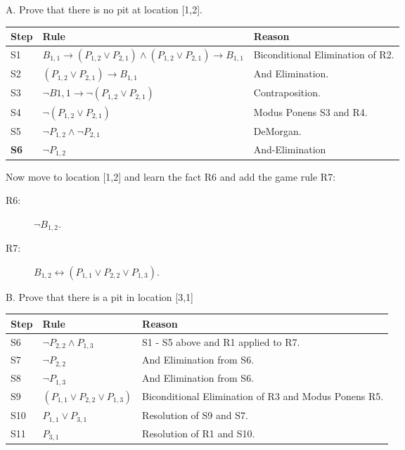 \documentclass[]{article}
\begin{document}
A.  Prove that there is no pit at location [1,2].
\vspace{4mm}

{\tabulinesep=1.5mm
\begin{tabu}{| l | l | l |}
\hline
Step & Rule & Reason \\
\hline
S1 & $B_{1,1} \rightarrow (P_{1,2} \vee P_{2,1}) \wedge (P_{1,2} \vee P_{2,1}) \rightarrow B_{1,1}$ & Biconditional Elimination of R2. \\
S2 & $(P_{1,2} \vee P_{2,1}) \rightarrow B_{1,1}$ & And Elimination. \\
S3 & $\neg B{1,1} \rightarrow \neg(P_{1,2} \vee P_{2,1})$ & Contraposition. \\
S4 & $\neg(P_{1,2} \vee P_{2,1})$ & Modus Ponens S3 and R4. \\
S5 & $\neg P_{1,2} \wedge \neg P_{2,1}$ & DeMorgan. \\
\textbf{S6} & $\neg P_{1,2}$ & And-Elimination \\
\hline
\end{tabu}}

\vspace{4mm}
Now move to location [1,2] and learn the fact R6 and add the game rule R7: 
\begin{description}
\item[R6:] $\neg B_{1,2}$.
\item[R7:] $B_{1,2} \leftrightarrow (P_{1,1} \vee P_{2,2} \vee P_{1,3})$.
\end{description}

B.  Prove that there is a pit in location [3,1]
\vspace{4mm}

{\tabulinesep=1.5mm
\begin{tabu}{| l | l | l |}
\hline
Step & Rule & Reason \\
\hline
S6 & $\neg P_{2,2} \wedge P_{1,3}$ & S1 - S5 above and R1 applied to R7. \\
S7 & $\neg P_{2,2}$ & And Elimination from S6. \\
S8 & $\neg P_{1,3}$ & And Elimination from S6. \\
S9 & $(P_{1,1} \vee P_{2,2} \vee P_{1,3})$ & Biconditional Elimination of R3 and Modus Ponens R5.\\
S10 & $P_{1,1} \vee P_{3,1}$ & Resolution of S9 and S7. \\
S11 & $P_{3,1}$ & Resolution of R1 and S10. \\
\hline
\end{tabu}}
\end{document}
